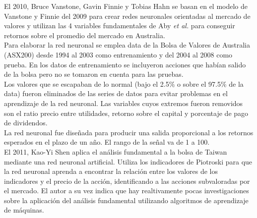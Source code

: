 
El 2010, Bruce Vanstone, Gavin Finnie y Tobias Hahn \cite{Vanstone2010} se basan en el modelo de Vanstone y Finnie del 2009 \cite{Vanstone2009} para crear redes neuronales orientadas al mercado de valores y utilizan las 4 variables fundamentales de Aby \textit{et al.} \cite{Aby2001} para conseguir retornos sobre el promedio del mercado en Australia.\\

Para elaborar la red neuronal se emplea data de la Bolsa de Valores de Australia (ASX200) desde 1994 al 2003 como entrenamiento y del 2004 al 2008 como prueba. En los datos de entrenamiento se incluyeron acciones que habían salido de la bolsa pero no se tomaron en cuenta para las pruebas.\\

Los valores que se escapaban de lo normal (bajo el 2.5\% o sobre el 97.5\% de la data) fueron eliminados de las series de datos para evitar problemas en el aprendizaje de la red neuronal. Las variables cuyos extremos fueron removidos son el ratio precio entre utilidades, retorno sobre el capital y porcentaje de pago de dividendos.\\

La red neuronal fue diseñada para producir una salida proporcional a los retornos esperados en el plazo de un año. El rango de la señal va de 1 a 100.\\



El 2011, Kao-Yi Shen \cite{Shen2011} aplica el an\'alisis fundamental a la bolsa de Taiwan mediante una red neuronal artificial. Utiliza los indicadores de Piotroski \cite{Piotroski2000} para que la red neuronal aprenda a encontrar la relación entre los valores de los indicadores y el precio de la acción, identificando a las acciones subvaloradas por el mercado. El autor a su vez indica que hay realtivamente pocas investigaciones sobre la aplicaci\'on del an\'alisis fundamental utilizando algoritmos de aprendizaje de m\'aquinas.\\

